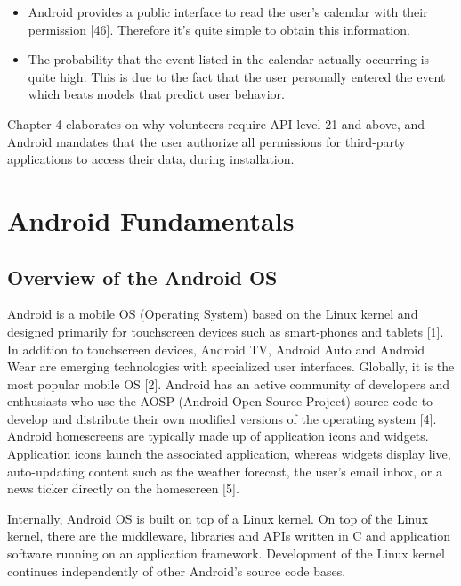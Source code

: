 \documentclass[12pt]{uthesis-v12}  %
\begin{document}
			\begin{itemize}
				\item Android provides a public interface to read the user's calendar with their permission [46]. Therefore it's quite simple to obtain this information.
				\item The probability that the event listed in the calendar actually occurring is quite high. This is due to the fact that the user personally entered the event which beats models that predict user behavior.  
			\end{itemize}
			
			Chapter 4 elaborates on why volunteers require API level 21 and above, and Android mandates that the user authorize all permissions for third-party applications to access their data, during installation.
			
	\section{Android Fundamentals} 
		\subsection{Overview of the Android OS}
			Android is a mobile OS (Operating System) based on the Linux kernel and designed primarily for touchscreen devices such as smart-phones and tablets [1]. In addition to touchscreen devices, Android TV, Android Auto and Android Wear are emerging technologies with specialized user interfaces. Globally, it is the most popular mobile OS [2]. Android has an active community of developers and enthusiasts who use the AOSP (Android Open Source Project) source code to develop and distribute their own modified versions of the operating system [4]. Android homescreens are typically made up of application icons and widgets. Application icons launch the associated application, whereas widgets display live, auto-updating content such as the weather forecast, the user's email inbox, or a news ticker directly on the homescreen [5].
			
			Internally, Android OS is built on top of a Linux kernel. On top of the Linux kernel, there are the middleware, libraries and APIs written in C and application software running on an application framework. Development of the Linux kernel continues independently of other Android's source code bases.
			
\end{document}
